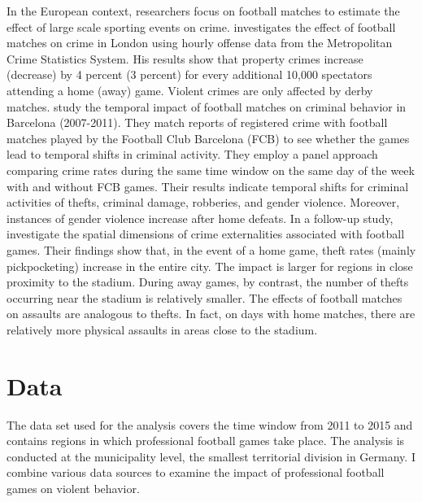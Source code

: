 In the European context, researchers focus on football matches to estimate the effect of large scale sporting events on crime. \cite{marie2016police} investigates the effect of football matches on crime in London using hourly offense data from the Metropolitan Crime Statistics System. His results show that property crimes increase (decrease) by 4 percent (3 percent) for every additional 10,000 spectators attending a home (away) game. Violent crimes are only affected by derby matches. \cite{montolio2016time} study the temporal impact of football matches on criminal behavior in Barcelona (2007-2011). They match reports of registered crime with football matches played by the Football Club Barcelona (FCB) to see whether the games lead to temporal shifts in criminal activity. They employ a panel approach comparing crime rates during the same time window on the same day of the week with and without FCB games. Their results indicate temporal shifts for criminal activities of thefts, criminal damage, robberies, and gender violence. Moreover, instances of gender violence increase after home defeats. In a follow-up study, \cite{montolio2019measuring} investigate the spatial dimensions of crime externalities associated with football games. Their findings show that, in the event of a home game, theft rates (mainly pickpocketing) increase in the entire city. The impact is larger for regions in close proximity to the stadium. During away games, by contrast, the number of thefts occurring near the stadium is relatively smaller. The effects of football matches on assaults are analogous to thefts. In fact, on days with home matches, there are relatively more physical assaults in areas close to the stadium.





\bigskip
\section{Data}\label{sec_soc_ext:data} 
The data set used for the analysis covers the time window from 2011 to 2015 and contains regions in which professional football games take place. The analysis is conducted at the municipality level, the smallest territorial division in Germany. I combine various data sources to examine the impact of professional football games on violent behavior.



